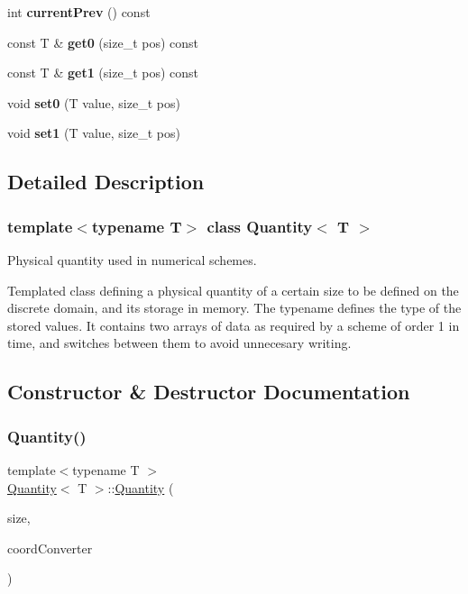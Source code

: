 \begin{DoxyCompactItemize}
\mbox{\label{classQuantity_a0695a0b97d36ea8c39538f6156f0a878}} 
int {\bfseries current\+Prev} () const
\item 
\mbox{\label{classQuantity_ad02771a40d16a4c293af97a4fd523d57}} 
const T \& {\bfseries get0} (size\+\_\+t pos) const
\item 
\mbox{\label{classQuantity_aae08f6fa99d0b180586f0bc3b7a79682}} 
const T \& {\bfseries get1} (size\+\_\+t pos) const
\item 
\mbox{\label{classQuantity_a0c6e6842590a156a1d79dacc0b5400bf}} 
void {\bfseries set0} (T value, size\+\_\+t pos)
\item 
\mbox{\label{classQuantity_aefb1880eb7f32e0ec0fb05430032168b}} 
void {\bfseries set1} (T value, size\+\_\+t pos)
\end{DoxyCompactItemize}


\subsection{Detailed Description}
\subsubsection*{template$<$typename T$>$\newline
class Quantity$<$ T $>$}

Physical quantity used in numerical schemes. 

Templated class defining a physical quantity of a certain size to be defined on the discrete domain, and its storage in memory. The typename defines the type of the stored values. It contains two arrays of data as required by a scheme of order 1 in time, and switches between them to avoid unnecesary writing. 

\subsection{Constructor \& Destructor Documentation}
\mbox{\label{classQuantity_ab07b278cfe453e82756684b1730efc95}} 
\subsubsection{\texorpdfstring{Quantity()}{Quantity()}}
{\footnotesize\ttfamily template$<$typename T $>$ \\
\mbox{\hyperlink{classQuantity}{Quantity}}$<$ T $>$\+::\mbox{\hyperlink{classQuantity}{Quantity}} (\begin{DoxyParamCaption}\item[{unsigned int}]{size,  }\item[{const \mbox{\hyperlink{classCoordConverter}{Coord\+Converter}} \&}]{coord\+Converter }\end{DoxyParamCaption})}



